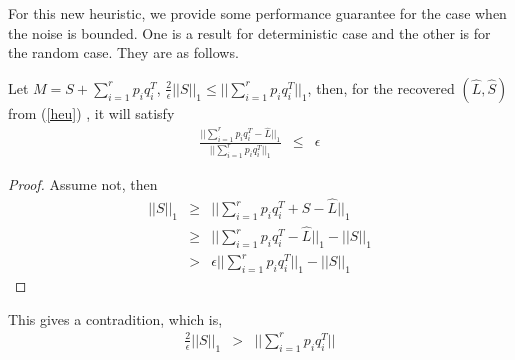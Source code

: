 For this new heuristic, we provide some performance guarantee for the case
when the noise is bounded. One is a result for deterministic case
and the other is for the random case. They are as follows.
\begin{prop}
Let $M=S+\sum_{i=1}^{r}p_{i}q_{i}^{T}$, $\frac{2}{\epsilon}||S||_{1}\le||\sum_{i=1}^{r}p_{i}q_{i}^{T}||_{1}$,
then, for the recovered $(\hat{L},\hat{S})$ from (\ref{heu}) , it
will satisfy
\begin{eqnarray*}
\frac{||\sum_{i=1}^{r}p_{i}q_{i}^{T}-\hat{L}||_{1}}{||\sum_{i=1}^{r}p_{i}q_{i}^{T}||_{1}} & \le & \epsilon
\end{eqnarray*}
\end{prop}
\begin{proof}
Assume not, then
\begin{eqnarray*}
||S||_{1} & \ge & ||\sum_{i=1}^{r}p_{i}q_{i}^{T}+S-\hat{L}||_{1}\\
 & \ge & ||\sum_{i=1}^{r}p_{i}q_{i}^{T}-\hat{L}||_{1}-||S||_{1}\\
 & > & \epsilon||\sum_{i=1}^{r}p_{i}q_{i}^{T}||_{1}-||S||_{1}
\end{eqnarray*}

\end{proof}
This gives a contradition, which is,
\begin{eqnarray*}
\frac{2}{\epsilon}||S||_{1} & > & ||\sum_{i=1}^{r}p_{i}q_{i}^{T}||
\end{eqnarray*}

